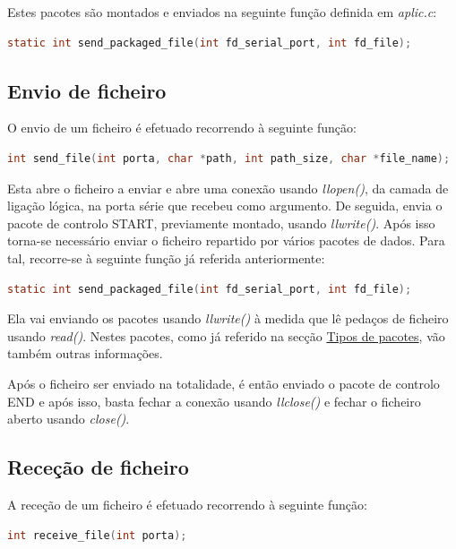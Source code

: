 \documentclass[a4paper,11pt,portuguese]{article}
\begin{document}
    \hfill \break
    \noindent Estes pacotes são montados e enviados na seguinte função definida em \textit{aplic.c}:

\begin{lstlisting}[language=C]
static int send_packaged_file(int fd_serial_port, int fd_file);
\end{lstlisting}


    \subsection{Envio de ficheiro}
    O envio de um ficheiro é efetuado recorrendo à seguinte função:

\begin{lstlisting}[language=C]
int send_file(int porta, char *path, int path_size, char *file_name);
\end{lstlisting}

    \noindent Esta abre o ficheiro a enviar e abre uma conexão usando \textit{llopen()}, da camada
    de ligação lógica, na porta série que recebeu como argumento. De seguida, envia o pacote de controlo
    START, previamente montado, usando \textit{llwrite()}. Após isso torna-se necessário enviar o
    ficheiro repartido por vários pacotes de dados. Para tal, recorre-se à seguinte função já referida
    anteriormente:

\begin{lstlisting}[language=C]
static int send_packaged_file(int fd_serial_port, int fd_file);
\end{lstlisting}

    \noindent Ela vai enviando os pacotes usando \textit{llwrite()} à medida que lê pedaços de ficheiro usando
    \textit{read()}. Nestes pacotes, como já referido na secção \hyperref[pacotesdados]{Tipos de pacotes}, 
    vão também outras informações. \par
    
    Após o ficheiro ser enviado na totalidade, é então enviado o pacote de controlo END e após isso, basta fechar 
    a conexão usando \textit{llclose()} e fechar o ficheiro aberto usando \textit{close()}.

    
    \subsection{Receção de ficheiro}
    A receção de um ficheiro é efetuado recorrendo à seguinte função:
    
\begin{lstlisting}[language=C]
int receive_file(int porta);
\end{lstlisting}
    
\end{document}
